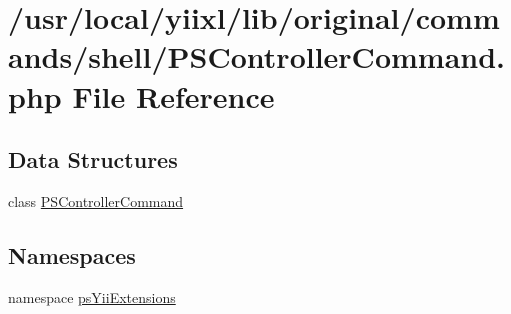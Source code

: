 \hypertarget{PSControllerCommand_8php}{
\section{/usr/local/yiixl/lib/original/commands/shell/PSControllerCommand.php File Reference}
\label{PSControllerCommand_8php}
}
\subsection*{Data Structures}
\begin{DoxyCompactItemize}
\item 
class \hyperlink{classPSControllerCommand}{PSControllerCommand}
\end{DoxyCompactItemize}
\subsection*{Namespaces}
\begin{DoxyCompactItemize}
\item 
namespace \hyperlink{namespacepsYiiExtensions}{psYiiExtensions}
\end{DoxyCompactItemize}
